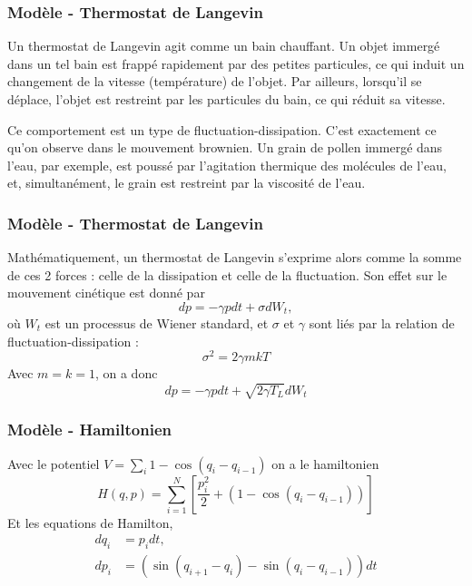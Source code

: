 \begin{frame}

    \frametitle{Modèle - Thermostat de Langevin}

    Un thermostat de Langevin agit comme un bain chauffant.
    Un objet immergé dans un tel bain est
    frappé rapidement par des petites particules, ce qui
    induit un changement de la vitesse (température) de l'objet.
    Par ailleurs, lorsqu'il se déplace, l'objet est restreint
    par les particules du bain, ce qui réduit sa vitesse.

    Ce comportement est un type de fluctuation-dissipation. C'est
    exactement ce qu'on observe dans le mouvement brownien. Un
    grain de pollen immergé dans l'eau, par exemple, est
    poussé par l'agitation thermique des molécules de l'eau, et,
    simultanément, le grain est restreint par la viscosité de l'eau.

\end{frame}

\begin{frame}

    \frametitle{Modèle - Thermostat de Langevin}

    Mathématiquement, un thermostat de Langevin s'exprime alors
    comme la somme de ces 2 forces : celle de la dissipation et celle
    de la fluctuation. Son effet sur le mouvement cinétique est
    donné par
    \[dp = - \gamma p dt + \sigma dW_t,\]
    où $W_t$ est un processus de Wiener standard, et $\sigma$ et $\gamma$
    sont liés par la relation de fluctuation-dissipation :
    \[\sigma^2 = 2 \gamma mkT\]
    Avec $m = k = 1$, on a donc
    \[dp = - \gamma p dt + \sqrt{2 \gamma T_L} dW_t\]


\end{frame}


%
%
%
%
%


\begin{frame}

    \frametitle{Modèle - Hamiltonien}

    Avec le potentiel $V = \sum_i 1 - \cos(q_i - q_{i-1})$ on
    a le hamiltonien
    \[H(q,p) = \sum_{i=1}^N \left[ \frac{p_i^2}{2}
             + (1 - \cos (q_i - q_{i-1})) \right]\]
    Et les equations de Hamilton,
    \begin{align*}
        dq_i &= p_i dt, \\
        dp_i &= (\sin(q_{i+1} - q_i) - \sin(q_i - q_{i-1}))dt
    \end{align*}


\end{frame}




